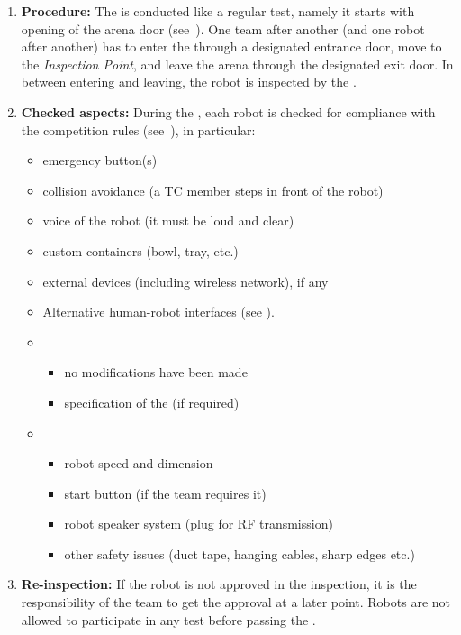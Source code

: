 \begin{enumerate}
	\item \textbf{Procedure:} The \RobotInspection{} is conducted like a regular test, namely it starts with opening of the arena door (see~). One team after another (and one robot after another) has to enter the \Arena{} through a designated entrance door, move to the \textit{Inspection Point}, and leave the arena through the designated exit door. In between entering and leaving, the robot is inspected by the \TC.
	\item \textbf{Checked aspects:} During the \RobotInspection{}, each robot is checked for compliance with the competition rules (see~), in particular:
	\begin{itemize}
		\item emergency button(s)
		\item collision avoidance (a TC member steps in front of the robot)
		\item voice of the robot (it must be loud and clear)
		\item custom containers (bowl, tray, etc.)
		\item external devices (including wireless network), if any
		\item Alternative human-robot interfaces (see \Rulebook).
		\item {}
		\begin{itemize}
			\item no modifications have been made
			\item specification of the  (if required)
		\end{itemize}
		\item {}
		\begin{itemize}
			\item robot speed and dimension
			\item start button (if the team requires it)
			\item robot speaker system (plug for RF transmission)
			\item other safety issues (duct tape, hanging cables, sharp edges etc.)
		\end{itemize}
	\end{itemize}
	\item \textbf{Re-inspection:} If the robot is not approved in the inspection, it is the responsibility of the team to get the approval at a later point. Robots are not allowed to participate in any test before passing the \RobotInspection.

\end{enumerate}
